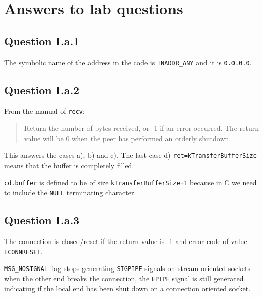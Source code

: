 

\def \nazovUlohy{Lab 2 - Simple, flawed Server}
\def \skola{\textbf{Chalmers university - Computer science}}
\def \tema{Homework from computer networks}
\def \author{\textbf{Michal Šustr}, \textbf{Arnaud D'Artigues}}
\def \email{\href{mailto:michal.sustr@gmail.com}{\texttt{michal.sustr@gmail.com}} \\ \href{mailto:arnaud.dartigues@gmail.com}{\texttt{arnaud.dartigues@gmail.com}}}
\def \date{8. 9. 2014}







\section{Answers to lab questions}
\subsection*{Question I.a.1}
The symbolic name of the address in the code is \texttt{INADDR\_ANY} and it is \texttt{0.0.0.0}.

\subsection*{Question I.a.2}
From the manual of \texttt{recv}:
\begin{quote}
Return  the  number  of bytes received, or -1 if an error occurred.  The return value will be 0 when the peer  has  performed  an orderly shutdown.
\end{quote}
This answers the cases a), b) and c). The last case d) \texttt{ret=kTransferBufferSize} means that the buffer is completely filled. 

\texttt{cd.buffer} is defined to be of size \texttt{kTransferBufferSize+1} because in C we need to include the \texttt{NULL} terminating character.

\subsection*{Question I.a.3}
The connection is closed/reset if the return value is -1 and error code of value \texttt{ECONNRESET}.

\texttt{MSG\_NOSIGNAL} flag stops generating \texttt{SIGPIPE} signals on stream oriented sockets when the other end breaks the connection, the \texttt{EPIPE} signal is still generated indicating if the  local  end  has  been  shut  down  on a connection oriented socket.
 
